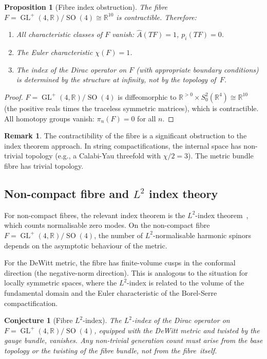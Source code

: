 \documentclass[12pt,a4paper]{article}
\newtheorem{proposition}[theorem]{Proposition}
\newtheorem{conjecture}[theorem]{Conjecture}
\theoremstyle{definition}
\newtheorem{remark}[theorem]{Remark}
\newcommand{\GL}{\operatorname{GL}}
\newcommand{\SO}{\operatorname{SO}}
\newcommand{\R}{\mathbb{R}}
\newcommand{\Ahat}{\hat{A}}
\begin{document}
\begin{proposition}[Fibre index obstruction]
\label{prop:fibre_index}
The fibre $F = \GL^+(4,\R)/\SO(4) \cong \R^{10}$ is contractible.
Therefore:
\begin{enumerate}[nosep]
\item All characteristic classes of $F$ vanish: $\Ahat(TF) = 1$, $p_i(TF) = 0$.
\item The Euler characteristic $\chi(F) = 1$.
\item The index of the Dirac operator on $F$ (with appropriate boundary conditions) is determined by the structure at infinity, not by the topology of~$F$.
\end{enumerate}
\end{proposition}

\begin{proof}
$F = \GL^+(4,\R)/\SO(4)$ is diffeomorphic to $\R^{>0} \times S^2_0(\R^4) \cong \R^{10}$ (the positive reals times the traceless symmetric matrices), which is contractible.
All homotopy groups vanish: $\pi_n(F) = 0$ for all $n$.
\end{proof}

\begin{remark}
The contractibility of the fibre is a significant obstruction to the index theorem approach.
In string compactifications, the internal space has non-trivial topology (e.g., a Calabi-Yau threefold with $\chi/2 = 3$).
The metric bundle fibre has trivial topology.
\end{remark}

\subsection{Non-compact fibre and \texorpdfstring{$L^2$}{L²} index theory}

For non-compact fibres, the relevant index theorem is the $L^2$-index theorem~\cite{Atiyah1976}, which counts normalisable zero modes.
On the non-compact fibre $F = \GL^+(4,\R)/\SO(4)$, the number of $L^2$-normalisable harmonic spinors depends on the asymptotic behaviour of the metric.

For the DeWitt metric, the fibre has finite-volume cusps in the conformal direction (the negative-norm direction).
This is analogous to the situation for locally symmetric spaces, where the $L^2$-index is related to the volume of the fundamental domain and the Euler characteristic of the Borel-Serre compactification.

\begin{conjecture}[Fibre $L^2$-index]
\label{conj:L2_index}
\sloppy
The $L^2$-index of the Dirac operator on
$F = \GL^+(4,\R)/\SO(4)$, equipped with the DeWitt metric and twisted by the gauge bundle, vanishes.
Any non-trivial generation count must arise from the \emph{base} topology or the \emph{twisting} of the fibre bundle, not from the fibre~itself.
\end{conjecture}
\end{document}
